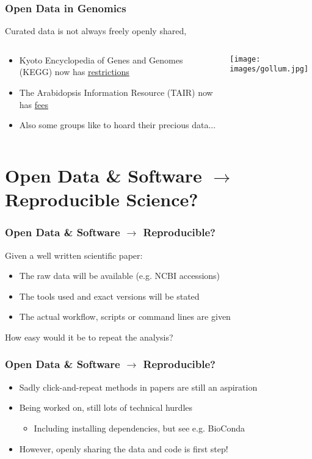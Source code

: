 \begin{frame}
  \frametitle{Open Data in Genomics}
  Curated data is not always freely openly shared,
\begin{columns}[T]
\begin{column}{.5\textwidth}
  \begin{itemize}
    \item Kyoto Encyclopedia of Genes and Genomes (KEGG) now has \href{http://www.kegg.jp/kegg/legal.html}{restrictions}
    \item The Arabidopsis Information Resource (TAIR) now has \href{https://www.arabidopsis.org/doc/about/tair_subscriptions/413}{fees}
    \item Also some groups like to hoard their precious data...
  \end{itemize}
\end{column}
\begin{column}{.5\textwidth}
  \texttt{[image: images/gollum.jpg]}
\end{column}
\end{columns}
\end{frame}

\section{Open Data \& Software $\rightarrow$ Reproducible Science?}

\begin{frame}
  \frametitle{Open Data \& Software $\rightarrow$ Reproducible?}
  Given a well written scientific paper:
  \begin{itemize}
    \item The raw data will be available (e.g. NCBI accessions)
    \item The tools used and exact versions will be stated
    \item The actual workflow, scripts or command lines are given
  \end{itemize}
  How easy would it be to repeat the analysis?
\end{frame}


\begin{frame}
  \frametitle{Open Data \& Software $\rightarrow$ Reproducible?}
  \begin{itemize}
    \item Sadly click-and-repeat methods in papers are still an aspiration
    \item Being worked on, still lots of technical hurdles
      \begin{itemize}
        \item Including installing dependencies, but see e.g. BioConda
      \end{itemize}
    \item However, openly sharing the data and code is first step!
  \end{itemize}
\end{frame}

